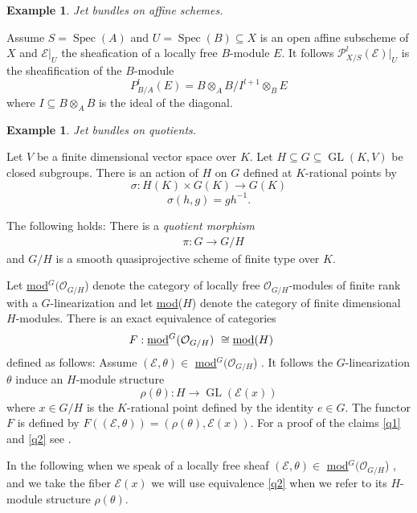 \documentclass{amsart}
\theoremstyle{plain}
\newtheorem{example}[theorem]{Example}
\theoremstyle{definition}
\theoremstyle{remark}
\numberwithin{equation}{theorem}
\begin{document}
\begin{example} Jet bundles on affine schemes. \end{example}
Assume $S={\operatorname{Spec} }(A)$ and  $U={\operatorname{Spec} }(B)\subseteq X$ is an open affine
subscheme of $X$
and ${\mathcal{E}}|_U$ the sheafication of a locally free $B$-module $E$. It
follows ${\mathcal{P} }^l_{X/S}({\mathcal{E}})|_U$ is the sheafification of the $B$-module
\[ P^l_{B/A}(E)=B\otimes_A B/I^{l+1}\otimes_B E \]
where $I\subseteq B\otimes_A B$ is the ideal of the diagonal.

\begin{example} Jet bundles on quotients.\end{example}

Let $V$ be a finite
dimensional vector space over $K$. Let $H\subseteq G \subseteq
{\operatorname{GL}}(K,V)$ be closed subgroups.
There is an action of $H$ on $G$  defined at $K$-rational points by 
\[ \sigma: H(K)\times G(K) \rightarrow G(K) \]
\[ \sigma(h,g)=gh^{-1}.\]

The following holds: There is a \emph{quotient morphism}
\begin{align}
&\label{q1}\pi:G\rightarrow G/H 
\end{align}
and $G/H$ is a smooth quasiprojective scheme of finite type over $K$.

Let {\underline{mod}$^G({\mathcal{O} }_{G/H}$) } denote the category of locally free ${\mathcal{O} }_{G/H}$-modules
of finite rank with a $G$-linearization and let {\underline{mod}($H$) } denote the
category of finite dimensional $H$-modules.
There is an exact equivalence of categories
\begin{align}
&\label{q2}F: \text{\underline{mod}$^G({\mathcal{O} }_{G/H}$) } \cong \text{\underline{mod}($H$) }
\end{align}
defined as follows: Assume $({\mathcal{E}},\theta) \in$ {\underline{mod}$^G({\mathcal{O} }_{G/H}$) }. It follows the
$G$-linearization $\theta$ induce an $H$-module structure 
\[ \rho(\theta): H\rightarrow {\operatorname{GL}}({\mathcal{E}}(x))  \]
where $x\in G/H$ is the $K$-rational point defined by the identity
$e\in G$. The functor $F$ is defined by $F(({\mathcal{E}},\theta))=(\rho(\theta),{\mathcal{E}}(x))$.
For a proof of the claims \ref{q1} and \ref{q2} see \cite{jantzen}.

In the
following when we speak of a locally free sheaf $({\mathcal{E}},\theta)\in$
{\underline{mod}$^G({\mathcal{O} }_{G/H}$) }, and we take the fiber ${\mathcal{E}}(x)$ we will use equivalence
\ref{q2} when we refer to its $H$-module structure $\rho(\theta)$.
\end{document}
